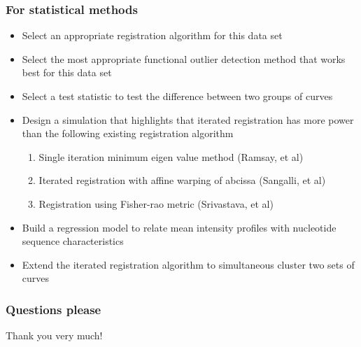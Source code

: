 \documentclass[10pt,dvipsnames,table]{beamer}
\begin{document}
\begin{frame}
\frametitle{For statistical methods}
\begin{itemize}
\item[\checkmark] Select an appropriate registration algorithm for this data set
\item[\checkmark] Select the most appropriate functional outlier detection method that works best for this data set
\item[\checkmark] Select a test statistic to test the difference between two groups of curves
\item Design a simulation that highlights that iterated registration has more power than the following existing registration algorithm
\begin{enumerate}
\item Single iteration minimum eigen value method (Ramsay, et al)
\item Iterated registration with affine warping of abcissa (Sangalli, et al)
\item Registration using Fisher-rao metric (Srivastava, et al)
\end{enumerate}
\item Build a regression model to relate mean intensity profiles with nucleotide sequence characteristics
\item Extend the iterated registration algorithm to simultaneous cluster two sets of curves
\end{itemize}
\end{frame}

\begin{frame}
\frametitle{Questions please}

Thank you very much!

\end{frame}
\end{document}
